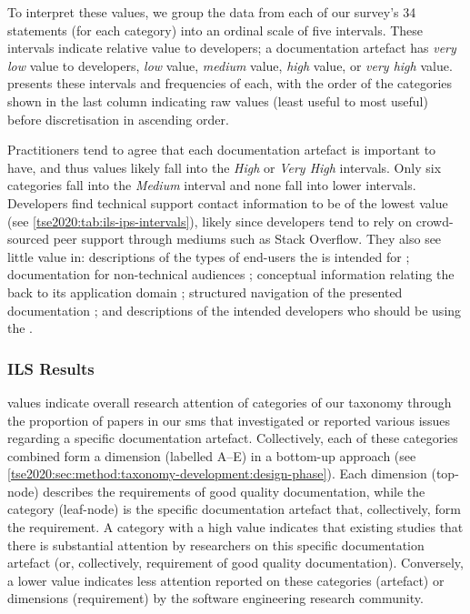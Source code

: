 To interpret these values, we group the data from each of our survey's 34 statements (for each category) into an ordinal scale of five intervals. These intervals indicate relative value to developers; a documentation artefact has \textit{very low} value to developers, \textit{low} value, \textit{medium} value, \textit{high} value, or \textit{very high} value.  presents these intervals and frequencies of each, with the order of the categories shown in the last column indicating raw  values (least useful to most useful) before discretisation in ascending order.

Practitioners tend to agree that each documentation artefact is important to have, and thus  values likely fall into the \textit{High} or \textit{Very High} intervals. Only six categories fall into the \textit{Medium} interval and none fall into lower intervals. Developers find technical support contact information  to be of the lowest value (see \cref{tse2020:tab:ils-ips-intervals}), likely since developers tend to rely on crowd-sourced peer support through mediums such as Stack Overflow. They also see little value in: descriptions of the types of end-users the  is intended for ; documentation for non-technical audiences ; conceptual information relating the  back to its application domain ; structured navigation of the presented  documentation ; and descriptions of the intended developers who should be using the  .

\subsubsection{ILS Results}
\label{tse2020:sec:tax-analysis:ils}
 values indicate overall research attention of categories of our taxonomy through the proportion of papers in our \gls{sms} that investigated or reported various issues regarding a specific  documentation artefact. Collectively, each of these categories combined form a dimension (labelled A--E) in a bottom-up approach (see \cref{tse2020:sec:method:taxonomy-development:design-phase}). Each dimension (top-node) describes the requirements of good quality  documentation, while the category (leaf-node) is the specific  documentation artefact that, collectively, form the requirement. A category with a high  value indicates that existing studies that there is substantial attention by researchers on this specific documentation artefact (or, collectively, requirement of good quality  documentation). Conversely, a lower  value indicates less attention reported on these categories (artefact) or dimensions (requirement) by the software engineering research community.

